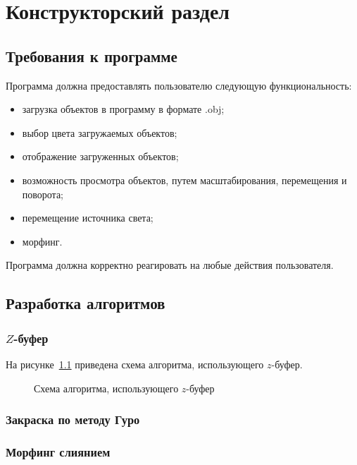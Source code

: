 \chapter{Конструкторский раздел}

\section{Требования к программе}

Программа должна предоставлять пользователю следующую функциональность:
\begin{itemize}[label*=---]
	\item загрузка объектов в программу в формате .obj;
	\item выбор цвета загружаемых объектов;
	\item отображение загруженных объектов;
	\item возможность просмотра объектов, путем масштабирования, перемещения и поворота;
	\item перемещение источника света;
	\item морфинг.
\end{itemize}

Программа должна корректно реагировать на любые действия пользователя.

\newpage

\section{Разработка алгоритмов}

\subsection{$Z$-буфер}

На рисунке~\ref{fig:zbuf} приведена схема алгоритма, использующего $z$-буфер.

\begin{figure}[h]
	\centering
	
	\caption{Схема алгоритма, использующего $z$-буфер}
	\label{fig:zbuf}
\end{figure}

\clearpage

\subsection{Закраска по методу Гуро}

\clearpage

\subsection{Морфинг слиянием}
